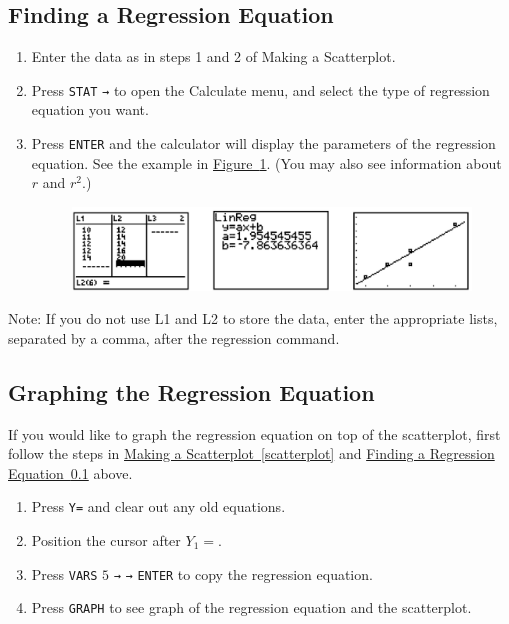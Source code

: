 \documentclass[10pt,]{book}
\theoremstyle{plain}
\theoremstyle{definition}
\theoremstyle{definition}
\theoremstyle{definition}
\numberwithin{equation}{part}
\begin{document}
\subsection[{Finding a Regression Equation}]{Finding a Regression Equation}\label{regression-equation}
\leavevmode%
\begin{enumerate}[label=*\arabic**]
\item\hypertarget{li-445}{}Enter the data as in steps 1 and 2 of Making a Scatterplot.%
\item\hypertarget{li-446}{}Press \lstinline?STAT? \lstinline?→? to open the Calculate menu, and select the type of regression equation you want.%
\item\hypertarget{li-447}{}Press \lstinline?ENTER? and the calculator will display the parameters of the regression equation. See the example in \hyperref[fig-GC-regression-line]{Figure~\ref{fig-GC-regression-line}}. (You may also see information about \(r\) and \(r^2\).) \leavevmode%
\begin{figure}
\centering
\includegraphics[width=1\linewidth]{images/fig-GC-regression-line.jpg}
\caption{\label{fig-GC-regression-line}}
\end{figure}
%
\end{enumerate}
 Note: If you do not use L1 and L2 to store the data, enter the appropriate lists, separated by a comma, after the regression command.%
\typeout{************************************************}
\typeout{************************************************}
\subsection[{Graphing the Regression Equation}]{Graphing the Regression Equation}\label{subsection-86}
If you would like to graph the regression equation on top of the scatterplot, first follow the steps in \hyperref[scatterplot]{Making a Scatterplot~\ref{scatterplot}} and \hyperref[regression-equation]{Finding a Regression Equation~\ref{regression-equation}} above. \leavevmode%
\begin{enumerate}[label=*\arabic**]
\item\hypertarget{li-448}{}Press \lstinline?Y=? and clear out any old equations.%
\item\hypertarget{li-449}{}Position the cursor after \(Y_1 =\).%
\item\hypertarget{li-450}{}Press \lstinline?VARS? \(5\) \lstinline?→? \lstinline?→? \lstinline?ENTER? to copy the regression equation.%
\item\hypertarget{li-451}{}Press \lstinline?GRAPH? to see graph of the regression equation and the scatterplot.%
\end{enumerate}
%
\typeout{************************************************}
\typeout{************************************************}
\end{document}
